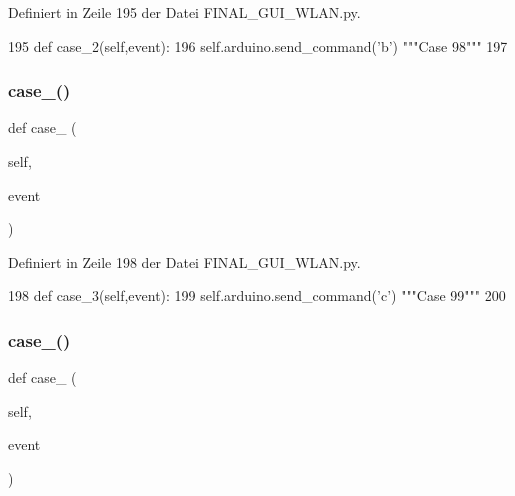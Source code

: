 Definiert in Zeile 195 der Datei F\+I\+N\+A\+L\+\_\+\+G\+U\+I\+\_\+\+W\+L\+A\+N.\+py.


\begin{DoxyCode}
195     \textcolor{keyword}{def }case\_2(self,event):
196         self.arduino.send\_command(\textcolor{stringliteral}{'b'})  \textcolor{stringliteral}{"""Case 98"""}
197 
\end{DoxyCode}
\mbox{\label{class_f_i_n_a_l___g_u_i___w_l_a_n_1_1_w_l_a_n_a1305b30e32f00b42a0dc48cf6035a5c6}} 
\subsubsection{\texorpdfstring{case\+\_()}{case\_3()}}
{\footnotesize\ttfamily def case\+\_ (\begin{DoxyParamCaption}\item[{}]{self,  }\item[{}]{event }\end{DoxyParamCaption})}



Definiert in Zeile 198 der Datei F\+I\+N\+A\+L\+\_\+\+G\+U\+I\+\_\+\+W\+L\+A\+N.\+py.


\begin{DoxyCode}
198     \textcolor{keyword}{def }case\_3(self,event):
199         self.arduino.send\_command(\textcolor{stringliteral}{'c'})  \textcolor{stringliteral}{"""Case 99"""}
200     
\end{DoxyCode}
\mbox{\label{class_f_i_n_a_l___g_u_i___w_l_a_n_1_1_w_l_a_n_a7adf7de62369cc6e2c43abdcfb28ac98}} 
\subsubsection{\texorpdfstring{case\+\_()}{case\_4()}}
{\footnotesize\ttfamily def case\+\_ (\begin{DoxyParamCaption}\item[{}]{self,  }\item[{}]{event }\end{DoxyParamCaption})}



